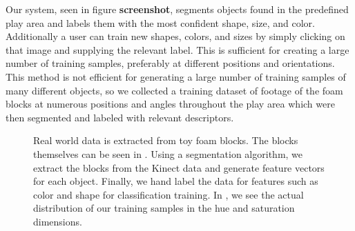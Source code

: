 \documentclass[11pt]{article}
\newcommand{\meh}[1]{{\bf \color{blue} #1}}
\begin{document}
Our system, seen in figure \meh{screenshot}, segments objects found in the 
predefined play area and labels them with the most confident shape, size, and 
color.  Additionally a user can train new shapes, colors, and sizes by simply 
clicking on that image and supplying the relevant label.  This is sufficient 
for creating a large number of training samples, preferably at different 
positions and orientations.  This method is not efficient for generating a 
large number of training samples of many different objects, so we collected a 
training dataset of footage of the foam blocks at numerous positions and angles throughout the play area which were then segmented and labeled with relevant 
descriptors.


\begin{figure}[h!]
\centering
{}
\caption{Real world data is extracted from toy foam blocks. The blocks
    themselves can be seen in . Using a segmentation
    algorithm, we extract the blocks from the Kinect data 
    and generate feature vectors for each object.
    Finally, we hand label the data for features such as color and shape for
    classification training. In , we see the actual
    distribution of our training samples in the hue and saturation
    dimensions.}
\label{fig:objects}
\end{figure}
\end{document}
